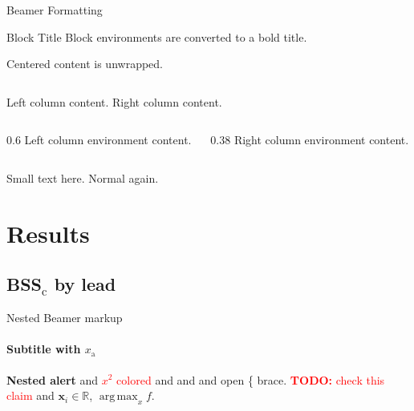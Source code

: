 \documentclass{beamer}
\newcommand{\TODO}[1]{\textcolor{red}{\textbf{TODO:} #1}}
\newcommand{\vect}[2][x]{%
  \mathbf{#1}_{#2}}
\newcommand*\Rset{\mathbb{R}}
\DeclareMathOperator*{\argmax}{arg\,max}
\begin{document}
\begin{frame}{Beamer Formatting}
\begin{block}{Block Title}
Block environments are converted to a bold title.
\end{block}
\vspace{1em}
\begin{center}
Centered content is unwrapped.
\end{center}
\medskip
\begin{columns}
Left column content.
Right column content.
\end{columns}
\begin{columns}[T]
  \begin{column}{0.6\textwidth}
    Left column environment content.
  \end{column}
  \begin{column}[c]{0.38\textwidth}
    Right column environment content.
  \end{column}
\end{columns}
\small Small text here. \normalsize Normal again.
\end{frame}

\section{Results}

\subsection{BSS$_\text{c}$ by lead}

\begin{frame}{Nested Beamer markup}
\framesubtitle{Subtitle with $x_{\text{a}}$}
\alert{\textbf{Nested alert}} and \textcolor{red}{$x^{2}$ colored} and
 and  and
\alert{open \{ brace}.
\TODO{check this claim} and $\vect{i} \in \Rset$, $\argmax_x f$.
\setlength{\parskip}{1em}
\vspace*{2pt}
\end{frame}
\end{document}
